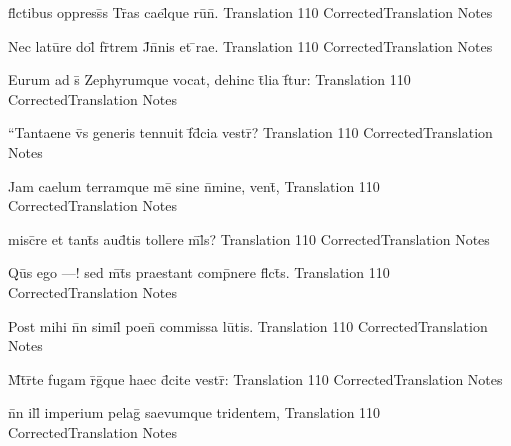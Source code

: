 \documentclass[]{book}
\begin{document}
\latline
  {fl\={}ctibus oppress\={}s Tr\={}as cael\={\macron {\i}}que ru\={\macron {\i}}n\={}.}
  { Translation }
  {110}
  { CorrectedTranslation }
  { Notes }



\newpage

\latline
  {Nec latu\={}re dol\={\macron {\i}} fr\={}trem J\={}n\={}nis et \={\macron {\i}}rae.}
  { Translation }
  {110}
  { CorrectedTranslation }
  { Notes }


\latline
  {Eurum ad s\={} Zephyrumque vocat, dehinc t\={}lia f\={}tur:}
  { Translation }
  {110}
  { CorrectedTranslation }
  { Notes }


\latline
  {``Tantaene v\={}s generis tennuit f\={\macron {\i}}d\={}cia vestr\={\macron {\i}}?}
  { Translation }
  {110}
  { CorrectedTranslation }
  { Notes }



\newpage

\latline
  {Jam caelum terramque me\={} sine n\={}mine, vent\={\macron {\i}},}
  { Translation }
  {110}
  { CorrectedTranslation }
  { Notes }


\latline
  {misc\={}re et tant\={}s aud\={}tis tollere m\={}l\={}s?}
  { Translation }
  {110}
  { CorrectedTranslation }
  { Notes }


\latline
  {Qu\={}s ego ---! sed m\={}t\={}s praestant comp\={}nere fl\={}ct\={}s.}
  { Translation }
  {110}
  { CorrectedTranslation }
  { Notes }



\newpage

\latline
  {Post mihi n\={}n simil\={\macron {\i}} poen\={} commissa lu\={}tis.}
  { Translation }
  {110}
  { CorrectedTranslation }
  { Notes }


\latline
  {M\={}t\={}r\={}te fugam r\={}g\={\macron {\i}}que haec d\={\macron {\i}}cite vestr\={}:}
  { Translation }
  {110}
  { CorrectedTranslation }
  { Notes }


\latline
  {n\={}n ill\={\macron {\i}} imperium pelag\={\macron {\i}} saevumque tridentem,}
  { Translation }
  {110}
  { CorrectedTranslation }
  { Notes }
\end{document}
